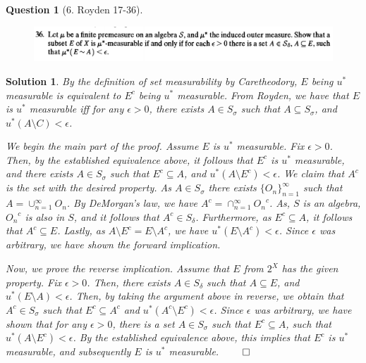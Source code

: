 \documentclass{article} %
\theoremstyle{quest}
\newtheorem*{question}{Question}
\newtheorem*{solution}{Solution}
\begin{document}
\newpage

\begin{question}[6. Royden 17-36]
\hfill
\begin{figure}[h!]
  \centering
    \includegraphics[width=1\textwidth]{17-36.png}
\end{figure}
\end{question}
\begin{solution}
By the definition of set measurability by Caretheodory, $E$ being
$u^*$ measurable is equivalent to $E^c$ being $u^*$ measurable. From Royden,
we have that $E$ is $u^*$ measurable iff for any $\epsilon > 0$,
there exists $A \in S_{\sigma}$ 
such that $A \subseteq S_{\sigma}$, and $u^{*}(A \setminus C) < \epsilon $.

\smallskip
 
We begin the main part of the proof.
Assume $E$ is $u^*$ measurable. Fix $\epsilon > 0$.
Then, by the established equivalence above,
it follows that $E^c$ is $u^*$ measurable, and there exists $A \in S_{\sigma}$
such that $E^c \subseteq A$, and $u^{*}(A \setminus E^c) < \epsilon $.
We claim that $A^c$ is the set with the desired property. As $A \in S_{\sigma}$
there exists $\{ O_n \}_{n=1}^{\infty}$ such that $A = \cup_{n=1}^{\infty}
O_n$. By DeMorgan's law, we have $A^c = \cap_{n=1}^{\infty} {O_n}^{c}$. As,
$S$ is an algebra, ${O_n}^c$ is also in $S$, and it follows that $A^c \in 
S_{\delta}$. Furthermore, as $E^c \subseteq A$, it follows that $A^c \subseteq
E$. Lastly, as $A \setminus E^c = E \setminus A^c$, we have $u^{*}(
E \setminus A^c) < \epsilon$. Since $\epsilon$ was arbitrary, we have shown
the forward implication. 

Now, we prove the reverse implication. Assume that $E$ from $2^X$ has the
given property.  
Fix $\epsilon > 0$. Then, there exists $A \in S_{\delta}$ such that $A \subseteq
E$, and $u^{*}(E\setminus A) < \epsilon$. Then, by taking the argument
above in reverse, we obtain that $A^c \in S_{\sigma}$ such that 
$E^c \subseteq A^c$ and $u^{*}(A^c \setminus E^c) < \epsilon$. Since $\epsilon$
was arbitrary, we have shown that for any $\epsilon > 0$, there is a set
$A \in S_{\sigma}$ such that $E^c \subseteq A$, such that $u^{*}(A \setminus E^c)
<\epsilon$. By the established equivalence above, this implies that $E^c$ 
is $u^*$ measurable, and subsequently $E$ is $u^*$ measurable.
\hfill $\qed$
 

\end{solution}
\end{document}

